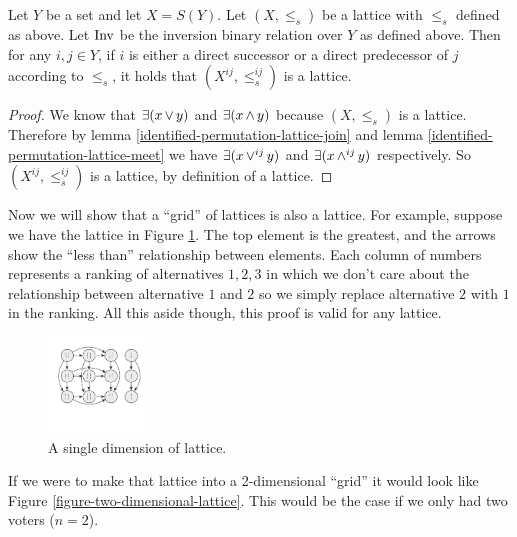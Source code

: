 	\begin{proposition}
		\label{proposition-identification-is-lattice}
		Let $Y$ be a set and let $X = S(Y)$. Let $(X, \le_s)$ be a lattice with $\le_s$ defined as above. Let $\operatorname{Inv}$ be the inversion binary relation over $Y$ as defined above. Then for any $i,j \in Y$, if $i$ is either a direct successor or a direct predecessor of $j$ according to $\le_s$, it holds that $(X^{ij}, \le^{ij}_s)$ is a lattice.
	\end{proposition}

	\begin{proof}
		We know that $\exists(x \operatorname{\vee} y)$ and $\exists(x \operatorname{\wedge} y)$ because $(X, \le_s)$ is a lattice. Therefore by lemma \ref{identified-permutation-lattice-join} and lemma \ref{identified-permutation-lattice-meet} we have $\exists(x \operatorname{\vee}^{ij} y)$ and $\exists(x \operatorname{\wedge}^{ij} y)$ respectively. So $(X^{ij}, \le^{ij}_s)$ is a lattice, by definition of a lattice.
	\end{proof}

	Now we will show that a ``grid'' of lattices is also a lattice. For example, suppose we have the lattice in Figure \ref{figure-one-dimensional-lattice}. The top element is the greatest, and the arrows show the ``less than'' relationship between elements. Each column of numbers represents a ranking of alternatives ${1, 2, 3}$ in which we don't care about the relationship between alternative $1$ and $2$ so we simply replace alternative $2$ with $1$ in the ranking. All this aside though, this proof is valid for any lattice.

	\begin{figure}[ht]
		\begin{center}
			\includegraphics[width=1in]{../figures/diagram5.pdf}
			\caption{A single dimension of lattice.}
			\label{figure-one-dimensional-lattice}
		\end{center}
	\end{figure}

	If we were to make that lattice into a 2-dimensional ``grid'' it would look like Figure \ref{figure-two-dimensional-lattice}. This would be the case if we only had two voters ($n = 2$).

